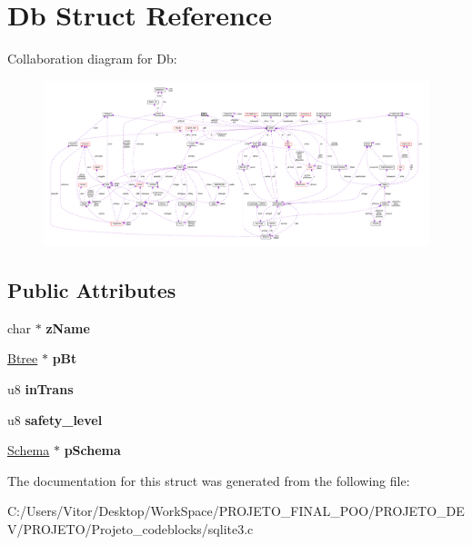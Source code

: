 \hypertarget{struct_db}{\section{Db Struct Reference}
\label{struct_db}
}


Collaboration diagram for Db\-:\nopagebreak
\begin{figure}[H]
\begin{center}
\leavevmode
\includegraphics[width=350pt]{struct_db__coll__graph}
\end{center}
\end{figure}
\subsection*{Public Attributes}
\begin{DoxyCompactItemize}
\item 
\hypertarget{struct_db_a6df2b5d7c8fd68e92cea961d9e3b279b}{char $\ast$ {\bfseries z\-Name}}\label{struct_db_a6df2b5d7c8fd68e92cea961d9e3b279b}

\item 
\hypertarget{struct_db_a0633e5a6abfc39246d07cc6a417a5852}{\hyperlink{struct_btree}{Btree} $\ast$ {\bfseries p\-Bt}}\label{struct_db_a0633e5a6abfc39246d07cc6a417a5852}

\item 
\hypertarget{struct_db_a4c5495ebea317212f0b41aa2795a7bc9}{u8 {\bfseries in\-Trans}}\label{struct_db_a4c5495ebea317212f0b41aa2795a7bc9}

\item 
\hypertarget{struct_db_a04597a5c023d8b328193450b177ff24c}{u8 {\bfseries safety\-\_\-level}}\label{struct_db_a04597a5c023d8b328193450b177ff24c}

\item 
\hypertarget{struct_db_afd8647a83a4a7053231b92814520d6d4}{\hyperlink{struct_schema}{Schema} $\ast$ {\bfseries p\-Schema}}\label{struct_db_afd8647a83a4a7053231b92814520d6d4}

\end{DoxyCompactItemize}


The documentation for this struct was generated from the following file\-:\begin{DoxyCompactItemize}
\item 
C\-:/\-Users/\-Vitor/\-Desktop/\-Work\-Space/\-P\-R\-O\-J\-E\-T\-O\-\_\-\-F\-I\-N\-A\-L\-\_\-\-P\-O\-O/\-P\-R\-O\-J\-E\-T\-O\-\_\-\-D\-E\-V/\-P\-R\-O\-J\-E\-T\-O/\-Projeto\-\_\-codeblocks/sqlite3.\-c\end{DoxyCompactItemize}
